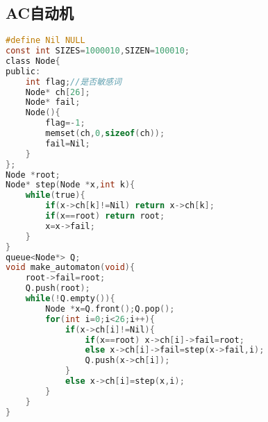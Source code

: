 \subsection{AC自动机}
\begin{lstlisting}[language=C] 
#define Nil NULL
const int SIZES=1000010,SIZEN=100010;
class Node{
public:
	int flag;//是否敏感词
	Node* ch[26];
	Node* fail;
	Node(){
		flag=-1;
		memset(ch,0,sizeof(ch));
		fail=Nil;
	}
};
Node *root;
Node* step(Node *x,int k){
	while(true){
		if(x->ch[k]!=Nil) return x->ch[k];
		if(x==root) return root;
		x=x->fail;
	}
}
queue<Node*> Q;
void make_automaton(void){
	root->fail=root;
	Q.push(root);
	while(!Q.empty()){
		Node *x=Q.front();Q.pop();
		for(int i=0;i<26;i++){
			if(x->ch[i]!=Nil){
				if(x==root) x->ch[i]->fail=root;
				else x->ch[i]->fail=step(x->fail,i);
				Q.push(x->ch[i]);
			}
			else x->ch[i]=step(x,i);
		}
	}
}
\end{lstlisting} 
